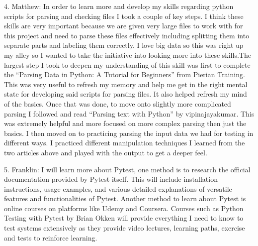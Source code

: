 \documentclass[12pt, titlepage]{article}
\begin{document}
\begin{enumerate}
4. Matthew: In order to learn more and develop my skills regarding python scripts for parsing and checking files I took a couple of key steps. I think these skills are very important because we are given very large files to work with for this project and need to parse these files effectively including splitting them into separate parts and labeling them correctly. I love big data so this was right up my alley so I wanted to take the initiative into looking more into these skills.The largest step I took to deepen my understanding of this skill was first to complete the “Parsing Data in Python: A Tutorial for Beginners” from Pierian Training. This was very useful to refresh my memory and help me get in the right mental state for developing said scripts for parsing files. It also helped refresh my mind of the basics. Once that was done, to move onto slightly more complicated parsing I followed and read “Parsing text with Python” by vipinajayakumar. This was extremely helpful and more focused on more complex parsing then just the basics. I then moved on to practicing parsing the input data we had for testing in different ways. I practiced different manipulation techniques I learned from the two articles above and played with the output to get a deeper feel.

5. Franklin: I will learn more about Pytest, one method is to research the official documentation provided by Pytest itself. This will include installation instructions, usage examples, and various detailed explanations of versatile features and functionalities of Pytest. Another method to learn about Pytest is online courses on platforms like Udemy and Coursera. Courses such as Python Testing with Pytest by Brian Okken will provide everything I need to know to test systems extensively as they provide video lectures, learning paths, exercise and tests to reinforce learning.
\end{enumerate}
\end{document}
